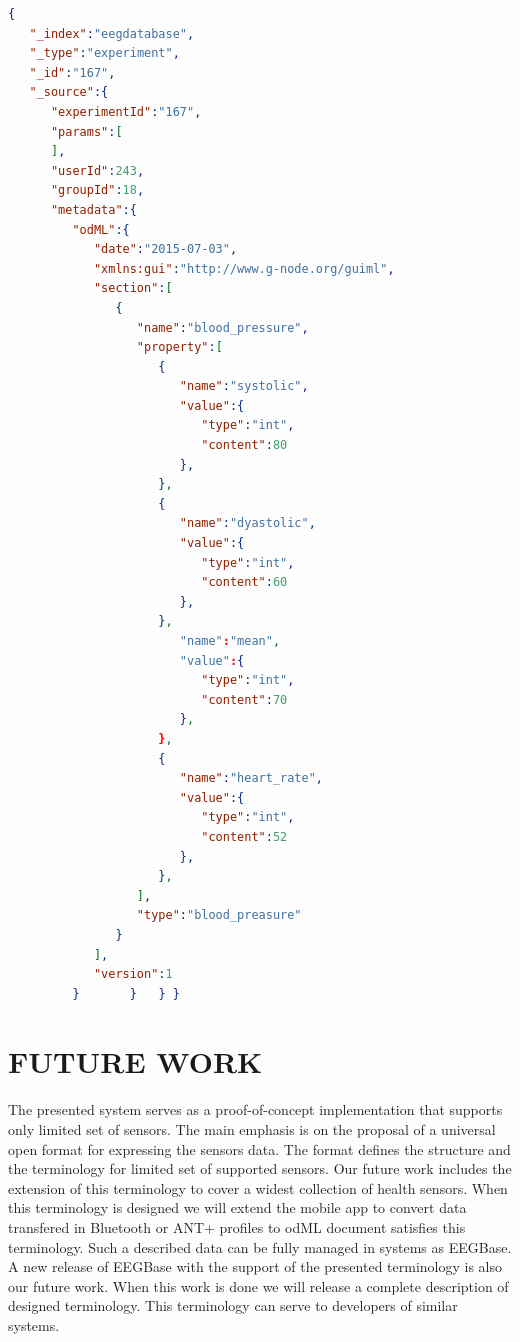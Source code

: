 \documentclass[a4paper,twoside]{article}
\begin{document}
\begin{lstlisting}[language=json,caption=blood preasure examle, label=odml_example]
{
   "_index":"eegdatabase",
   "_type":"experiment",
   "_id":"167",
   "_source":{
      "experimentId":"167",
      "params":[
      ],
      "userId":243,
      "groupId":18,
      "metadata":{
         "odML":{
            "date":"2015-07-03",
            "xmlns:gui":"http://www.g-node.org/guiml",
            "section":[
               {
                  "name":"blood_pressure",
                  "property":[
                     {
                        "name":"systolic",
                        "value":{
                           "type":"int",
                           "content":80
                        },
                     },
                     {
                        "name":"dyastolic",
                        "value":{
                           "type":"int",
                           "content":60
                        },
                     },
                        "name":"mean",
                        "value":{
                           "type":"int",
                           "content":70
                        },
                     },
                     {
                        "name":"heart_rate",
                        "value":{
                           "type":"int",
                           "content":52
                        },
                     },
                  ],
                  "type":"blood_preasure"
               }
            ],
            "version":1
         }       }   } }
\end{lstlisting}


\section{\uppercase{Future Work}}
\label{future-work}
\noindent
The presented system serves as a proof-of-concept implementation that supports only limited set of sensors. The main emphasis is on the proposal of a universal open format for expressing the sensors data. The format defines the structure and the terminology for limited set of supported sensors. Our future work includes the extension of this terminology to cover a widest collection of health sensors. When this terminology is designed we will extend the mobile app to convert data transfered in Bluetooth or ANT+ profiles to odML document satisfies this terminology. Such a described data can be fully managed in systems as EEGBase. A new release of EEGBase with the support of the presented terminology is also our future work. When this work is done we will release a complete description of designed terminology. This terminology can serve to developers of similar systems.
\end{document}
